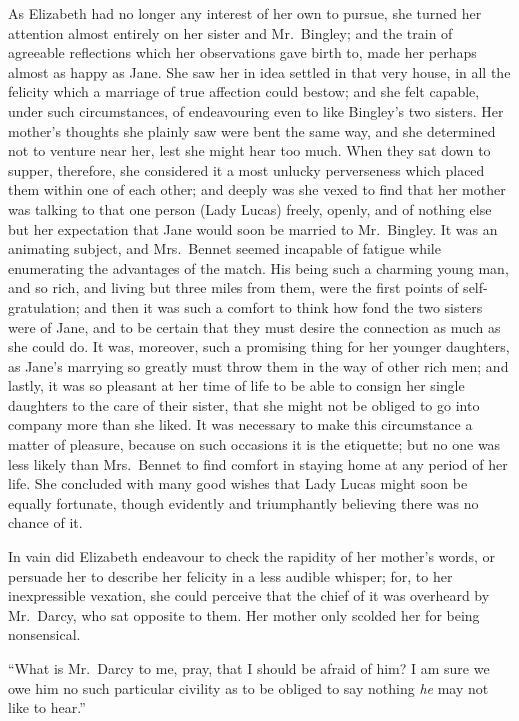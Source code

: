 \documentclass[12pt,english]{book}
\begin{document}
As Elizabeth had no longer any interest of her own to pursue, she
turned her attention almost entirely on her sister and Mr.\ Bingley;
and the train of agreeable reflections which her observations gave
birth to, made her perhaps almost as happy as Jane. She saw her in
idea settled in that very house, in all the felicity which a marriage
of true affection could bestow; and she felt capable, under such circumstances,
of endeavouring even to like Bingley's two sisters. Her mother's thoughts
she plainly saw were bent the same way, and she determined not to
venture near her, lest she might hear too much. When they sat down
to supper, therefore, she considered it a most unlucky perverseness
which placed them within one of each other; and deeply was she vexed
to find that her mother was talking to that one person (Lady Lucas)
freely, openly, and of nothing else but her expectation that Jane
would soon be married to Mr.\ Bingley. It was an animating subject,
and Mrs.\ Bennet seemed incapable of fatigue while enumerating the
advantages of the match. His being such a charming young man, and
so rich, and living but three miles from them, were the first points
of self-gratulation; and then it was such a comfort to think how fond
the two sisters were of Jane, and to be certain that they must desire
the connection as much as she could do. It was, moreover, such a promising
thing for her younger daughters, as Jane's marrying so greatly must
throw them in the way of other rich men; and lastly, it was so pleasant
at her time of life to be able to consign her single daughters to
the care of their sister, that she might not be obliged to go into
company more than she liked. It was necessary to make this circumstance
a matter of pleasure, because on such occasions it is the etiquette;
but no one was less likely than Mrs.\ Bennet to find comfort in staying
home at any period of her life. She concluded with many good wishes
that Lady Lucas might soon be equally fortunate, though evidently
and triumphantly believing there was no chance of it.

In vain did Elizabeth endeavour to check the rapidity of her mother's
words, or persuade her to describe her felicity in a less audible
whisper; for, to her inexpressible vexation, she could perceive that
the chief of it was overheard by Mr.\ Darcy, who sat opposite to
them. Her mother only scolded her for being nonsensical.

{}``What is Mr.\ Darcy to me, pray, that I should be afraid of him?
I am sure we owe him no such particular civility as to be obliged
to say nothing \textit{he} may not like to hear.''
\end{document}
